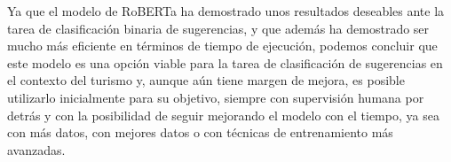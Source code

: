 Ya que el modelo de RoBERTa ha demostrado unos resultados deseables ante la tarea de clasificación binaria de sugerencias, y que además ha demostrado ser mucho más eficiente en términos de tiempo de ejecución, podemos concluir que este modelo es una opción viable para la tarea de clasificación de sugerencias en el contexto del turismo y, aunque aún tiene margen de mejora, es posible utilizarlo inicialmente para su objetivo, siempre con supervisión humana por detrás y con la posibilidad de seguir mejorando el modelo con el tiempo, ya sea con más datos, con mejores datos o con técnicas de entrenamiento más avanzadas.


 










